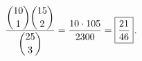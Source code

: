 $\dfrac{\dbinom{10}{1}\dbinom{15}{2}}{\dbinom{25}{3}}=\dfrac{10\cdot105}{2300}=\boxed{\dfrac{21}{46}}$.

